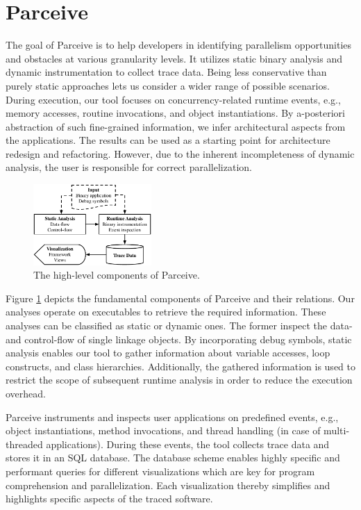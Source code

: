 \section{Parceive}
\label{sec:parceive}
The goal of Parceive is to help developers in identifying parallelism
opportunities and obstacles at various granularity levels. It utilizes static
binary analysis and dynamic instrumentation to collect trace data. Being less
conservative than purely static approaches lets us consider a wider range of
possible scenarios. During execution, our tool focuses on concurrency-related
runtime events, e.g., memory accesses, routine invocations, and object
instantiations. By a-posteriori abstraction of such fine-grained information,
we infer architectural aspects from the applications. The results can be used
as a starting point for architecture redesign and refactoring. However, due to
the inherent incompleteness of dynamic analysis, the user is responsible for
correct parallelization.

\begin{figure}[h!]
	\begin{center}
		\includegraphics[width=0.40\textwidth]{img/parceive}
		\caption{The high-level components of Parceive.}
		\label{fig:parceive_overview}
	\end{center}
\end{figure}

Figure \ref{fig:parceive_overview} depicts the fundamental components of
Parceive and their relations. Our analyses operate on executables to retrieve
the required information. These analyses can be classified as static or dynamic
ones. The former inspect the data- and control-flow of single linkage objects.
By incorporating debug symbols, static analysis enables our tool to gather
information about variable accesses, loop constructs, and class hierarchies.
Additionally, the gathered information is used to restrict the scope of
subsequent runtime analysis in order to reduce the execution overhead.

Parceive instruments and inspects user applications on predefined events, e.g.,
object instantiations, method invocations, and thread handling (in case of
multi-threaded applications). During these events, the tool collects trace data
and stores it in an SQL database. The database scheme enables highly specific
and performant queries for different visualizations which are key for program
comprehension and parallelization. Each visualization thereby simplifies and
highlights specific aspects of the traced software.